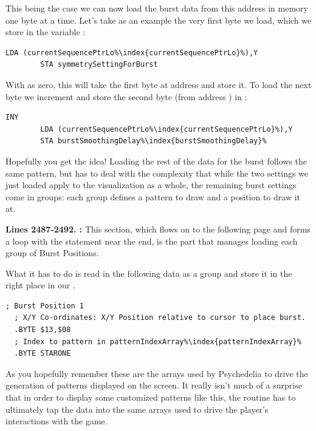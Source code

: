 This being the case we can now load the burst data from this address in memory one byte at a time. Let's take as an example the
very first byte we load, which we store in the variable :
\begin{lstlisting}[escapechar=\%]
        LDA (currentSequencePtrLo%\index{currentSequencePtrLo}%),Y
        STA symmetrySettingForBurst
\end{lstlisting}

With  as zero, this will take the first byte at address  and store it. To load the next byte we increment 
and store the second byte (from address ) in :
\begin{lstlisting}[escapechar=\%]
        INY 
        LDA (currentSequencePtrLo%\index{currentSequencePtrLo}%),Y
        STA burstSmoothingDelay%\index{burstSmoothingDelay}%
\end{lstlisting}

Hopefully you get the idea! Loading the rest of the data for the burst follows the same pattern, but has to deal with the complexity that
while the two settings we just loaded apply to the visualization as a whole, the remaining burst settings come in groups: each group defines
a pattern to draw and a position to draw it at.

\textbf{Lines 2487-2492. :} This section, which flows on to the following page and forms a loop with the
statement  near the end, is the part that manages loading each group of Burst Positions. 

What it has to do is read in the following data as a group and store it in the right place in our .
\begin{lstlisting}[escapechar=\%]
  ; Burst Position 1
  ; X/Y Co-ordinates: X/Y Position relative to cursor to place burst.
  .BYTE $13,$08
  ; Index to pattern in patternIndexArray%\index{patternIndexArray}%
  .BYTE STARONE
\end{lstlisting}
As you hopefully remember these are the arrays used by Psychedelia to drive the generation of patterns displayed on the screen. It really isn't much
of a surprise that in order to display some customized patterns like this, the routine has to ultimately tap the data into the same arrays used
to drive the player's interactions with the game.

